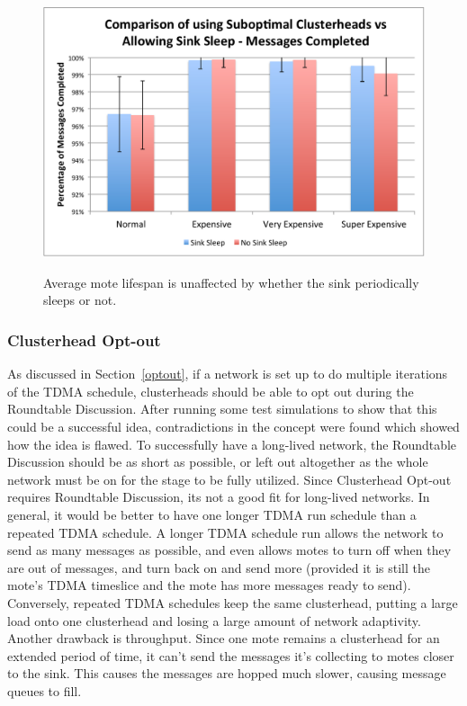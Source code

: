 \begin{figure}[htbp]
    \centering
        \includegraphics[height=3.2in]{images/SleepVsNo/MoteLife.pdf}
    \caption{Average mote lifespan is unaffected by whether the sink periodically sleeps or not.}
    \label{fig:images_SleepVsNo_MoteLife}
\end{figure}

\subsubsection{Clusterhead Opt-out}
As discussed in Section~\ref{optout}, if a network is set up to do multiple iterations of 
the TDMA schedule, clusterheads should be able to opt out during the Roundtable 
Discussion.
After running some test simulations to show that this could be a successful 
idea, contradictions in the concept were found which showed how the idea is 
flawed.
To successfully have a long-lived network, the Roundtable Discussion 
should be as short as possible, or left out altogether as the whole
network must be on for the stage to be fully utilized. Since Clusterhead Opt-out
requires Roundtable Discussion, its not a good fit for long-lived networks. In
general, it would be better to have one longer TDMA run schedule than a
repeated TDMA schedule. A longer TDMA schedule run allows the network to send as many 
messages as possible, and even allows motes to turn off when they are out of messages, and turn
back on and send more (provided it is still the mote's TDMA timeslice and the mote has
more messages ready to send).
Conversely, repeated TDMA schedules keep the same clusterhead, putting a large
load onto one clusterhead and losing a large amount of network adaptivity. Another 
drawback is throughput. Since one mote remains a clusterhead for an extended period of time, 
it can't send the messages it's collecting to motes closer to the sink. This causes the
messages are hopped much slower, causing message queues to fill.

